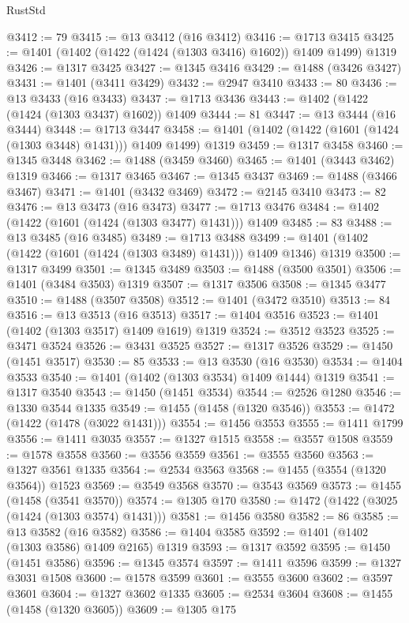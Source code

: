 \begin{lexlean}{RustStd}
\begin{coremodule}
@3412 := 79
@3415 := @13 @3412 (@16 @3412)
@3416 := @1713 @3415
@3425 := @1401 (@1402 (@1422 (@1424 (@1303 @3416) @1602)) @1409 @1499) @1319
@3426 := @1317 @3425
@3427 := @1345 @3416
@3429 := @1488 (@3426 @3427)
@3431 := @1401 (@3411 @3429)
@3432 := @2947 @3410
@3433 := 80
@3436 := @13 @3433 (@16 @3433)
@3437 := @1713 @3436
@3443 := @1402 (@1422 (@1424 (@1303 @3437) @1602)) @1409
@3444 := 81
@3447 := @13 @3444 (@16 @3444)
@3448 := @1713 @3447
@3458 := @1401 (@1402 (@1422 (@1601 (@1424 (@1303 @3448) @1431))) @1409 @1499) @1319
@3459 := @1317 @3458
@3460 := @1345 @3448
@3462 := @1488 (@3459 @3460)
@3465 := @1401 (@3443 @3462) @1319
@3466 := @1317 @3465
@3467 := @1345 @3437
@3469 := @1488 (@3466 @3467)
@3471 := @1401 (@3432 @3469)
@3472 := @2145 @3410
@3473 := 82
@3476 := @13 @3473 (@16 @3473)
@3477 := @1713 @3476
@3484 := @1402 (@1422 (@1601 (@1424 (@1303 @3477) @1431))) @1409
@3485 := 83
@3488 := @13 @3485 (@16 @3485)
@3489 := @1713 @3488
@3499 := @1401 (@1402 (@1422 (@1601 (@1424 (@1303 @3489) @1431))) @1409 @1346) @1319
@3500 := @1317 @3499
@3501 := @1345 @3489
@3503 := @1488 (@3500 @3501)
@3506 := @1401 (@3484 @3503) @1319
@3507 := @1317 @3506
@3508 := @1345 @3477
@3510 := @1488 (@3507 @3508)
@3512 := @1401 (@3472 @3510)
@3513 := 84
@3516 := @13 @3513 (@16 @3513)
@3517 := @1404 @3516
@3523 := @1401 (@1402 (@1303 @3517) @1409 @1619) @1319
@3524 := @3512 @3523
@3525 := @3471 @3524
@3526 := @3431 @3525
@3527 := @1317 @3526
@3529 := @1450 (@1451 @3517)
@3530 := 85
@3533 := @13 @3530 (@16 @3530)
@3534 := @1404 @3533
@3540 := @1401 (@1402 (@1303 @3534) @1409 @1444) @1319
@3541 := @1317 @3540
@3543 := @1450 (@1451 @3534)
@3544 := @2526 @1280
@3546 := @1330 @3544 @1335
@3549 := @1455 (@1458 (@1320 @3546))
@3553 := @1472 (@1422 (@1478 (@3022 @1431)))
@3554 := @1456 @3553
@3555 := @1411 @1799
@3556 := @1411 @3035
@3557 := @1327 @1515
@3558 := @3557 @1508
@3559 := @1578 @3558
@3560 := @3556 @3559
@3561 := @3555 @3560
@3563 := @1327 @3561 @1335
@3564 := @2534 @3563
@3568 := @1455 (@3554 (@1320 @3564)) @1523
@3569 := @3549 @3568
@3570 := @3543 @3569
@3573 := @1455 (@1458 (@3541 @3570))
@3574 := @1305 @170
@3580 := @1472 (@1422 (@3025 (@1424 (@1303 @3574) @1431)))
@3581 := @1456 @3580
@3582 := 86
@3585 := @13 @3582 (@16 @3582)
@3586 := @1404 @3585
@3592 := @1401 (@1402 (@1303 @3586) @1409 @2165) @1319
@3593 := @1317 @3592
@3595 := @1450 (@1451 @3586)
@3596 := @1345 @3574
@3597 := @1411 @3596
@3599 := @1327 @3031 @1508
@3600 := @1578 @3599
@3601 := @3555 @3600
@3602 := @3597 @3601
@3604 := @1327 @3602 @1335
@3605 := @2534 @3604
@3608 := @1455 (@1458 (@1320 @3605))
@3609 := @1305 @175

\end{coremodule}
\end{lexlean}
